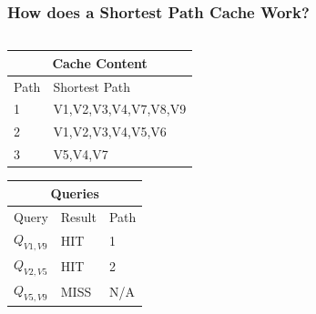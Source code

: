 \begin{frame}[red] %
\frametitle{How does a Shortest Path Cache Work?} %
\begin{columns}
  \begin{column}{0.5\textwidth}
\vspace{-1.5em}

\begin{tabularx}{\textwidth}{|l|X|} \hline
\multicolumn{2}{|c|}{\bf Cache Content} \\\hline \hline
Path & Shortest Path \\\hline
1 & V1,V2,V3,V4,V7,V8,V9 \\\hline
2 & V1,V2,V3,V4,V5,V6 \\\hline
3 & V5,V4,V7 \\\hline
\end{tabularx}

\vspace{2em}

\begin{tabularx}{\textwidth}{|l|l|X|} \hline
\multicolumn{3}{|c|}{\bf Queries} \\\hline \hline
Query & Result & Path \\\hline
$Q_{V1,V9}$ & HIT & 1\\\hline
$Q_{V2,V5}$ & HIT & 2\\\hline
$Q_{V5,V9}$ & MISS & N/A\\\hline
\end{tabularx}



\end{column}
\end{columns}
\end{frame}
